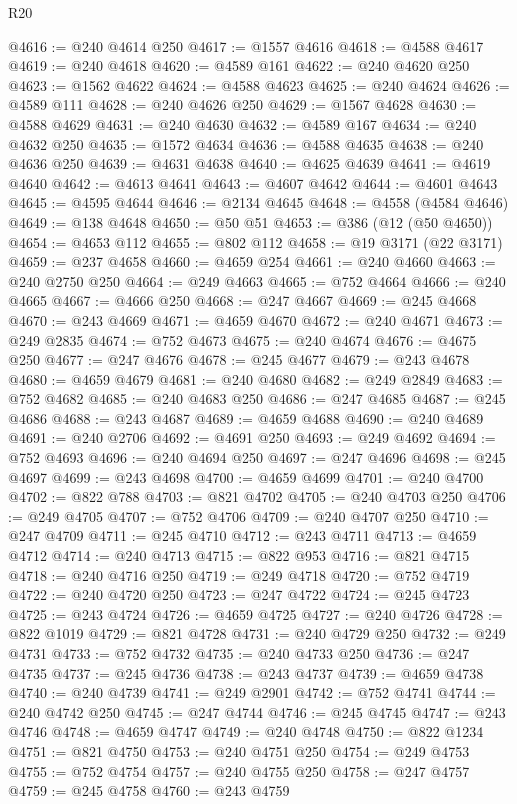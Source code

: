 \begin{lexlean}{R20}
\begin{coremodule}
{@4616 := @240 @4614 @250
@4617 := @1557 @4616
@4618 := @4588 @4617
@4619 := @240 @4618
@4620 := @4589 @161
@4622 := @240 @4620 @250
@4623 := @1562 @4622
@4624 := @4588 @4623
@4625 := @240 @4624
@4626 := @4589 @111
@4628 := @240 @4626 @250
@4629 := @1567 @4628
@4630 := @4588 @4629
@4631 := @240 @4630
@4632 := @4589 @167
@4634 := @240 @4632 @250
@4635 := @1572 @4634
@4636 := @4588 @4635
@4638 := @240 @4636 @250
@4639 := @4631 @4638
@4640 := @4625 @4639
@4641 := @4619 @4640
@4642 := @4613 @4641
@4643 := @4607 @4642
@4644 := @4601 @4643
@4645 := @4595 @4644
@4646 := @2134 @4645
@4648 := @4558 (@4584 @4646)
@4649 := @138 @4648
@4650 := @50 @51
@4653 := @386 (@12 (@50 @4650))
@4654 := @4653 @112
@4655 := @802 @112
@4658 := @19 @3171 (@22 @3171)
@4659 := @237 @4658
@4660 := @4659 @254
@4661 := @240 @4660
@4663 := @240 @2750 @250
@4664 := @249 @4663
@4665 := @752 @4664
@4666 := @240 @4665
@4667 := @4666 @250
@4668 := @247 @4667
@4669 := @245 @4668
@4670 := @243 @4669
@4671 := @4659 @4670
@4672 := @240 @4671
@4673 := @249 @2835
@4674 := @752 @4673
@4675 := @240 @4674
@4676 := @4675 @250
@4677 := @247 @4676
@4678 := @245 @4677
@4679 := @243 @4678
@4680 := @4659 @4679
@4681 := @240 @4680
@4682 := @249 @2849
@4683 := @752 @4682
@4685 := @240 @4683 @250
@4686 := @247 @4685
@4687 := @245 @4686
@4688 := @243 @4687
@4689 := @4659 @4688
@4690 := @240 @4689
@4691 := @240 @2706
@4692 := @4691 @250
@4693 := @249 @4692
@4694 := @752 @4693
@4696 := @240 @4694 @250
@4697 := @247 @4696
@4698 := @245 @4697
@4699 := @243 @4698
@4700 := @4659 @4699
@4701 := @240 @4700
@4702 := @822 @788
@4703 := @821 @4702
@4705 := @240 @4703 @250
@4706 := @249 @4705
@4707 := @752 @4706
@4709 := @240 @4707 @250
@4710 := @247 @4709
@4711 := @245 @4710
@4712 := @243 @4711
@4713 := @4659 @4712
@4714 := @240 @4713
@4715 := @822 @953
@4716 := @821 @4715
@4718 := @240 @4716 @250
@4719 := @249 @4718
@4720 := @752 @4719
@4722 := @240 @4720 @250
@4723 := @247 @4722
@4724 := @245 @4723
@4725 := @243 @4724
@4726 := @4659 @4725
@4727 := @240 @4726
@4728 := @822 @1019
@4729 := @821 @4728
@4731 := @240 @4729 @250
@4732 := @249 @4731
@4733 := @752 @4732
@4735 := @240 @4733 @250
@4736 := @247 @4735
@4737 := @245 @4736
@4738 := @243 @4737
@4739 := @4659 @4738
@4740 := @240 @4739
@4741 := @249 @2901
@4742 := @752 @4741
@4744 := @240 @4742 @250
@4745 := @247 @4744
@4746 := @245 @4745
@4747 := @243 @4746
@4748 := @4659 @4747
@4749 := @240 @4748
@4750 := @822 @1234
@4751 := @821 @4750
@4753 := @240 @4751 @250
@4754 := @249 @4753
@4755 := @752 @4754
@4757 := @240 @4755 @250
@4758 := @247 @4757
@4759 := @245 @4758
@4760 := @243 @4759
}
\end{coremodule}
\end{lexlean}
